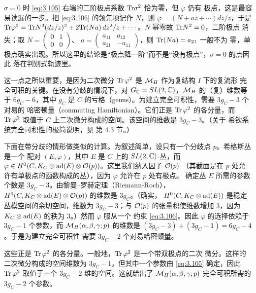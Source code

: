\begin{yizhu}[含糊点拨]
$\sigma=0$ 时 \eqref{eq:3.105} 右端的二阶极点系数 ${\rm Tr}\sigma^2$ 恰为零，但 $\varphi$ 仍有
极点，这是最容易读漏的一步。把 \eqref{eq:3.106} 的领先项记作 $N$，则
$\varphi=(N+az+\cdots)dz/z$，于是
${\rm Tr}\varphi^2={\rm Tr} N^2(dz/z)^2+2{\rm Tr}(Na)\,dz^2/z+\cdots$。$N$ 幂零故 ${\rm Tr} N^2=0$，二阶极点
消失；取 $N=\begin{pmatrix}0&1\\0&0\end{pmatrix}$、
$a=\begin{pmatrix}a_{11}&a_{12}\\a_{21}&-a_{11}\end{pmatrix}$，则 ${\rm Tr}(Na)=a_{21}$ 一般不为
零，单极点确实出现。所以这里的结论是“极点降一阶”而不是“没有极点”，$\sigma=0$ 的点因此
落在判别式轨迹里。
\end{yizhu}

这一点之所以重要，是因为二次微分 ${\rm Tr}\,\varphi^2$ 是 ${{\mathcal{M}}_H}$ 作为复结构 $I$ 下的复流形
完全可积的关键。在没有分歧的情况下，对 $G_{\mathbb{C}}=SL(2,{\mathbb{C}})$，${{\mathcal{M}}_H}$ 的（复）维数等于
$6g_C-6$，其中 $g_C$ 是 $C$ 的亏格（genus）。为建立完全可积性，需要 $3g_C-3$ 个对易的
哈密顿量（commuting Hamiltonian）。它们正是 ${\rm Tr}\,\varphi^2$ 的各分量，而
${\rm Tr}\,\varphi^2$ 取值于 $C$ 上二次微分构成的空间。该空间的维数是 $3g_C-3$。（关于
希钦系统完全可积性的极简说明，见 \cite{ref8} 第 4.3 节。）

下面在带分歧的情形做类似的计算。为叙述简单，设只有一个分歧点 $p$。希格斯丛是一个
配对 $(E,\varphi)$，其中 $E$ 是 $C$ 上的 $SL(2,{\mathbb{C}})$-丛，而
$\varphi\in H^0(C,K_C\otimes {\rm ad}(E)\otimes {\mathcal O}(p))$。这里我们纳入因子 ${\mathcal O}(p)$
（其截面是在 $p$ 处允许有单极点的函数构成的丛），因为 $\varphi$ 允许在 $p$ 处有极点。
确定丛 $E$ 所需的参数个数是 $3g_C-3$。由黎曼–罗赫定理（Riemann-Roch），
$H^0(C,K_C\otimes {\rm ad}(E)\otimes {\mathcal O}(p))$ 的维数是 $3g_C$。（确实，
$H^0(C,K_C\otimes{\rm ad}(E))$ 是稳定丛模空间的余切空间，维数为 $3g_C-3$；与 ${\mathcal O}(p)$
的张量积使维数增加 3，因为 $K_C\otimes {\rm ad}(E)$ 的秩为 3。）然而 $\varphi$ 服从一个
约束 \eqref{eq:3.106}。因此 $\varphi$ 的选择依赖于 $3g_C-1$ 个参数，而
${{\mathcal{M}}_H}(\alpha,\beta,\gamma;p)$ 的维数是 $(3g_C-3)+(3g_C-1)=6g_C-4$。于是为建立完全可积性
需要 $3g_C-2$ 个对易哈密顿量。

这些正是 ${\rm Tr}\,\varphi^2$ 的各分量。一般地，${\rm Tr}\,\varphi^2$ 是一个带双极点的二次
微分。这样的二次微分构成的空间维数为 $3g_C-1$，但其中一个参数由 \eqref{eq:3.105}
确定，因此 ${\rm Tr}\,\varphi^2$ 取值于一个 $3g_C-2$ 维的空间。这就给出了
${{\mathcal{M}}_H}(\alpha,\beta,\gamma;p)$ 完全可积所需的 $3g_C-2$ 个参数。

